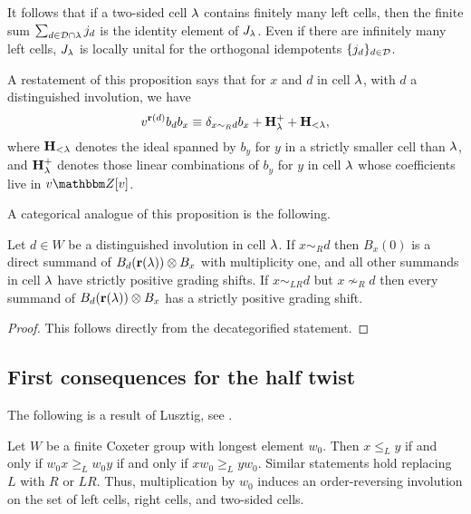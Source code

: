 \begin{remark} \label{rmk:Junit} It follows that if a two-sided cell $\lambda$ contains finitely many left cells, then the finite sum $\sum_{d \in {\mathcal{D}} \cap \lambda} j_d$ is the identity element of $J_{\lambda}$. Even if
there are infinitely many left cells, $J_{\lambda}$ is locally unital for the orthogonal idempotents $\{j_d\}_{d \in {\mathcal{D}}}$. \end{remark}	

A restatement of this proposition says that for $x$ and $d$ in cell $\lambda$, with $d$ a distinguished involution, we have
\begin{equation} \label{eq:dacts} v^{\mathbf{r}(d)} b_d b_x \equiv \delta_{x \sim_R d} b_x + {\mathbf H}^+_{\lambda} + {\mathbf H}_{< \lambda}, \end{equation}
where ${\mathbf H}_{< \lambda}$ denotes the ideal spanned by $b_y$ for $y$ in a strictly smaller cell than $\lambda$, and ${\mathbf H}^+_\lambda$ denotes those linear combinations of $b_y$ for $y$ in cell $\lambda$ whose coefficients live in $v\Z[v]$.

A categorical analogue of this proposition is the following.

\begin{cor}\label{cor:weakJringCat}
Let $d\in W$ be a distinguished involution in cell $\lambda$. If $x \sim_R d$ then $B_x(0)$ is a direct summand of $B_d(\mathbf{r}(\lambda)) \otimes B_x$ with multiplicity one, and all other summands in cell $\lambda$ have strictly positive grading shifts. If $x \sim_{LR} d$ but $x \nsim_R d$ then every summand of $B_d(\mathbf{r}(\lambda)) \otimes B_x$ has a strictly positive grading shift. \end{cor}

\begin{proof} This follows directly from the decategorified statement. \end{proof}


\subsection{First consequences for the half twist}
\label{subsec:halftwistconsequences}

The following is a result of Lusztig, see \cite[Corollary 11.7]{LuszUnequal14}.

\begin{prop} \label{prop:w0oncells} Let $W$ be a finite Coxeter group with longest element $w_0$. Then $x \le_L y$ if and only if $w_0 x \ge_L w_0 y$ if and only if $x w_0 \ge_L y w_0$.
Similar statements hold replacing $L$ with $R$ or $LR$. Thus, multiplication by $w_0$ induces an order-reversing involution on the set of left cells, right cells, and two-sided cells.
\end{prop}

